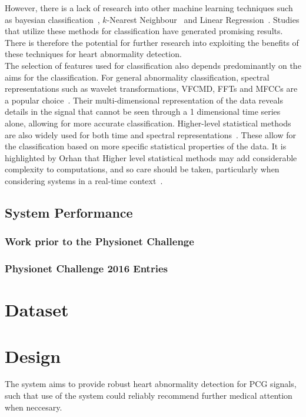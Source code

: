 \documentclass[titlepage, 12pt]{scrartcl} \usepackage{enumitem}
\begin{document}
However, there is a lack of research into other machine learning
techniques such as bayesian classification~\parencite{Lubaib2016},
$k$-Nearest Neighbour~\parencite{Quiceno-Manrique2010a, Lubaib2016} and
Linear Regression~\parencite{Orhan2013}. Studies that utilize these
methods for classification have generated promising results.  There is
therefore the potential for further research into exploiting the
benefits of these techniques for heart abnormality detection.\\

The selection of features used for classification also depends
predominantly on the aims for the classification. For general
abnormality classification, spectral representations such as wavelet
transformations, VFCMD, FFTs and MFCCs are a popular
choice~\parencite{Bung2000, Wu1995, Yaghouby2009, Dash2009}. Their
multi-dimensional representation of the data reveals details in the
signal that cannot be seen through a 1 dimensional time series alone,
allowing for more accurate classification. Higher-level statistical
methods are also widely used for both time and spectral
representations~\parencite{Bung2000, Quiceno-Manrique2010a,
Schmidt2015, Dash2009, Yaghouby2009}. These allow for the
classification based on more specific statistical properties of the
data. It is highlighted by Orhan that Higher level statistical methods
may add considerable complexity to computations, and so care should be
taken, particularly when considering systems in a real-time
context~\citeyearpar{Orhan2013}.


\subsection{System Performance}\label{performance}
\subsubsection{Work prior to the Physionet Challenge}
\subsubsection{Physionet Challenge 2016 Entries}


\section{Dataset}

\section{Design}
The system aims to provide robust heart abnormality detection for PCG signals,
such that use of the system could reliably recommend further medical attention
when neccesary.
\end{document}
